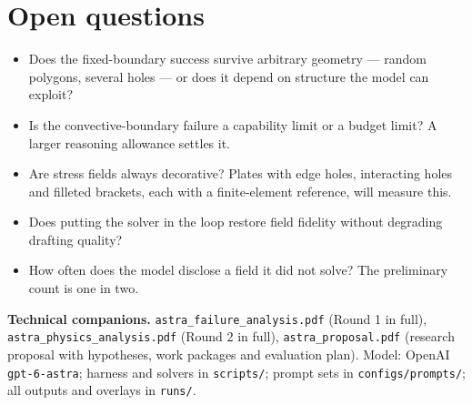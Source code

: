 \documentclass[11pt,a4paper]{article}
\begin{document}
\section{Open questions}
\begin{itemize}[leftmargin=2em,itemsep=2pt]
  \item Does the fixed-boundary success survive arbitrary geometry --- random polygons, several holes --- or does it depend on structure the model can exploit?
  \item Is the convective-boundary failure a capability limit or a budget limit? A larger reasoning allowance settles it.
  \item Are stress fields always decorative? Plates with edge holes, interacting holes and filleted brackets, each with a finite-element reference, will measure this.
  \item Does putting the solver in the loop restore field fidelity without degrading drafting quality?
  \item How often does the model disclose a field it did not solve? The preliminary count is one in two.
\end{itemize}

\vfill
\begin{footnotesize}
\begingroup\raggedright
\noindent\textbf{Technical companions.} \texttt{astra\_failure\_analysis.pdf} (Round 1 in full), \texttt{astra\_physics\_analysis.pdf} (Round 2 in full), \texttt{astra\_proposal.pdf} (research proposal with hypotheses, work packages and evaluation plan). Model: OpenAI \texttt{gpt-6-astra}; harness and solvers in \texttt{scripts/}; prompt sets in \texttt{configs/prompts/}; all outputs and overlays in \texttt{runs/}.\par
\endgroup
\end{footnotesize}
\end{document}
